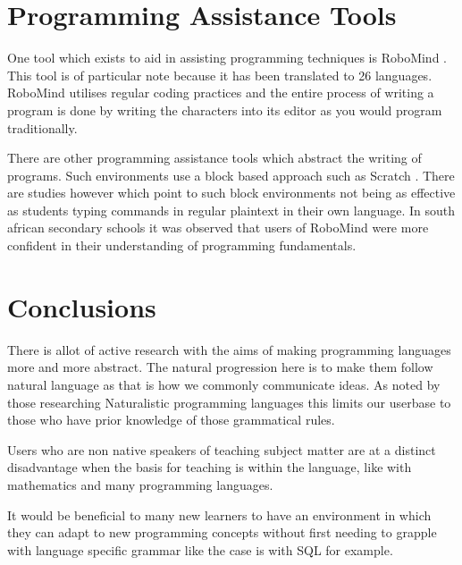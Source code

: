 \documentclass[12pt]{article}
\begin{document}
\section{Programming Assistance Tools}

One tool which exists to aid in assisting programming techniques is RoboMind \parencite{robomind}. This tool is of particular
note because it has been translated to 26 languages. RoboMind utilises regular coding practices and the entire process
of writing a program is done by writing the characters into its editor as you would program traditionally.

There are other programming assistance tools which abstract the writing of programs. Such environments use a block based approach such as
Scratch \parencite{resnick2005networked}. There are studies however which point to such block environments not being as effective
as students typing commands in regular plaintext in their own language. In south african secondary schools \parencite{koorsse2015programming}
it was observed that users of RoboMind were more confident in their understanding of programming fundamentals.


\section{Conclusions}

There is allot of active research with the aims of making programming languages more and more abstract. The natural progression here is
to make them follow natural language as that is how we commonly communicate ideas. As noted by those researching
Naturalistic programming languages this limits our userbase to those who have prior knowledge of those grammatical rules.

Users who are non native speakers of teaching subject matter are at a distinct disadvantage when the basis for teaching is
within the language, like with mathematics and many programming languages.

It would be beneficial to many new learners to have an environment in which they can
adapt to new programming concepts without first needing to grapple with language specific grammar like the case is with SQL for example.




\clearpage
\printbibliography
\end{document}

